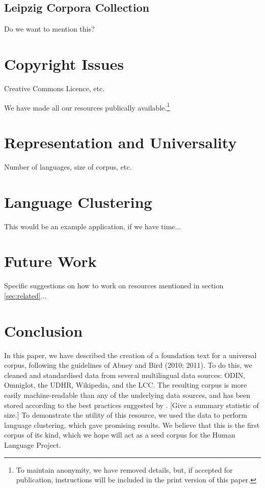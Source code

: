 \documentclass[11pt]{article}
\begin{document}
\subsection{Leipzig Corpora Collection}

Do we want to mention this?


\section{Copyright Issues} \label{sec:copyright}

Creative Commons Licence, etc.

We have made all our resources publically available.\footnote{To maintain anonymity, we have removed details, but, if accepted for publication, instructions will be included in the print version of this paper.}


\section{Representation and Universality} \label{sec:stats}

Number of languages, size of corpus, etc.


\section{Language Clustering} \label{sec:cluster}

This would be an example application, if we have time...


\section{Future Work} \label{sec:future}

Specific suggestions on how to work on resources mentioned in section \ref{sec:related}...


\section{Conclusion} \label{sec:conclusion}

In this paper, we have described the creation of a foundation text for a universal corpus, following the guidelines of Abney and Bird (2010; 2011). To do this, we cleaned and standardised data from several multilingual data sources: ODIN, Omniglot, the UDHR, Wikipedia, and the LCC. The resulting corpus is more easily machine-readable than any of the underlying data sources, and has been stored according to the best practices suggested by . [Give a summary statistic of size.] To demonstrate the utility of this resource, we used the data to perform language clustering, which gave promising results. We believe that this is the first corpus of its kind, which we hope will act as a seed corpus for the Human Language Project.



\end{document}
